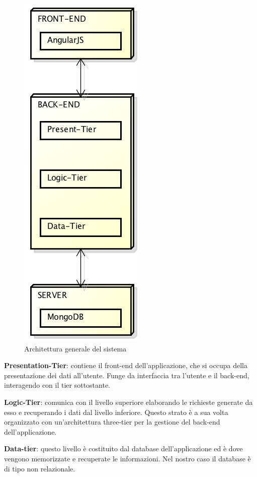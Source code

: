 \begin{figure}[h]
	\centering
	\includegraphics[height=0.6\textheight]{img/architettura_generale}
	\caption[Architettura generale del sistema]{Architettura generale del sistema}
\end{figure}

\textbf{Presentation-Tier}: contiene il front-end dell'applicazione, che si occupa della presentazione dei dati all'utente. Funge da interfaccia tra l'utente e il back-end, interagendo con il tier sottostante.

\textbf{Logic-Tier}: comunica con il livello superiore elaborando le richieste generate da esso e recuperando i dati dal livello inferiore. Questo strato è a sua volta organizzato con un'architettura three-tier per la gestione del back-end dell'applicazione.

\textbf{Data-tier}: questo livello è costituito dal database dell'applicazione ed è dove vengono memorizzate e recuperate le informazioni. Nel nostro caso il database è di tipo non relazionale.

